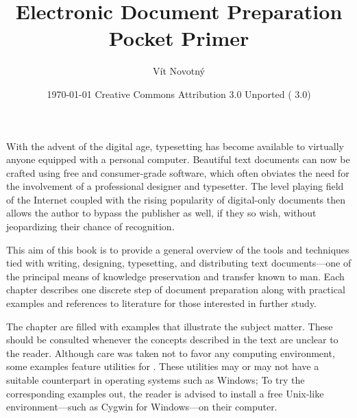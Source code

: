 \documentclass[
  a5paper,10pt,           %
  dvipsnames              %
]{book}
\begin{document}
\frontmatter
\title{Electronic Document Preparation\\Pocket Primer}
\author{Vít Novotný}
\date{\today\vfill\small{}\enspace
  Creative Commons Attribution 3.0 Unported (  3.0)}
\maketitle
\tableofcontents
\mainmatter
{}
With the advent of the digital age, typesetting has become available to
virtually anyone equipped with a personal computer. Beautiful text documents can
now be crafted using free and consumer-grade software, which often obviates the
need for the involvement of a professional designer and typesetter. The level
playing field of the Internet coupled with the rising popularity of digital-only
documents then allows the author to bypass the publisher as well, if they so
wish, without jeopardizing their chance of recognition.

This aim of this book is to provide a general overview of the tools and
techniques tied with writing, designing, typesetting, and distributing text
documents---one of the principal means of knowledge preservation and transfer
known to man. Each chapter describes one discrete step of document preparation
along with practical examples and references to literature for those interested
in further study.

The chapter are filled with examples that illustrate the subject matter. These
should be consulted whenever the concepts described in the text are unclear to
the reader. Although care was taken not to favor any computing environment,
some examples feature utilities for \Unices. These utilities may or may not have
a suitable counterpart in operating systems such as Windows; To try the
corresponding examples out, the reader is advised to install a free Unix-like
environment---such as Cygwin for Windows---on their computer.






\backmatter

\def\cite#1{$\!$}                    %
\printbibliography[heading=bibintoc] %

\def\index#1{} %
\printacronyms[heading=none]

\cleardoublepage
\def\index#1{} %
\printindex    %
\end{document}
